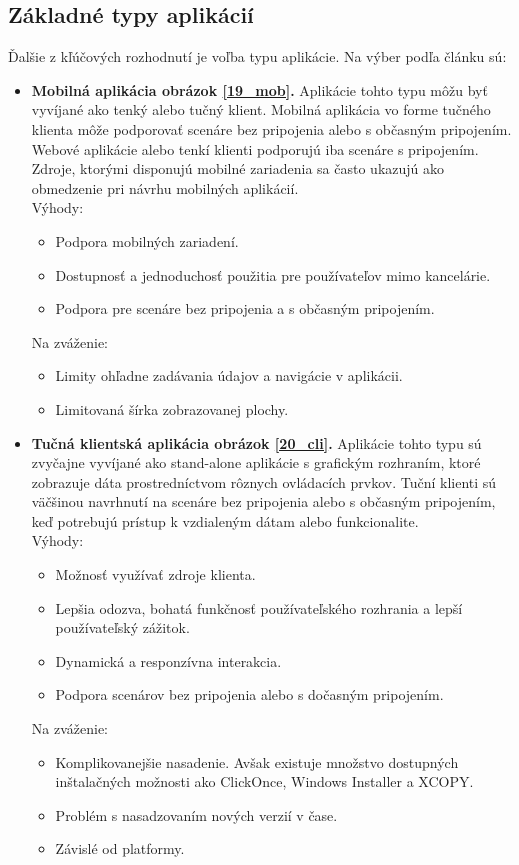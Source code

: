 \subsection{Základné typy aplikácií}
Ďalšie z kľúčových rozhodnutí je voľba typu aplikácie. Na výber podľa  článku \cite{IOT03} sú:
\begin{itemize}
\item
 \textbf{Mobilná aplikácia obrázok \ref{19_mob}.} Aplikácie tohto typu môžu byť vyvíjané ako tenký alebo tučný klient. Mobilná aplikácia vo forme tučného klienta môže podporovať scenáre bez pripojenia alebo s občasným pripojením. Webové aplikácie alebo tenkí klienti podporujú iba scenáre s pripojením. Zdroje, ktorými disponujú mobilné zariadenia sa často ukazujú ako obmedzenie pri návrhu mobilných aplikácií. \\
Výhody: 
 \begin{itemize}
   \item  Podpora mobilných zariadení.
   \item  Dostupnosť a jednoduchosť použitia pre používateľov mimo kancelárie.
   \item  Podpora pre scenáre bez pripojenia a s občasným pripojením.   
 \end{itemize}
Na zváženie: 
 \begin{itemize}
   \item Limity ohľadne zadávania údajov a navigácie v aplikácii.
   \item Limitovaná šírka zobrazovanej plochy.   
 \end{itemize}
 
\item
 \textbf{Tučná klientská aplikácia obrázok \ref{20_cli}.} Aplikácie tohto typu sú zvyčajne vyvíjané ako stand-alone aplikácie s grafickým rozhraním, ktoré zobrazuje dáta prostredníctvom rôznych ovládacích prvkov. Tuční klienti sú väčšinou navrhnutí na scenáre bez pripojenia alebo s občasným pripojením, keď potrebujú prístup k vzdialeným dátam alebo funkcionalite. \\
Výhody: 
 \begin{itemize}
   \item  Možnosť využívať zdroje klienta.
   \item  Lepšia odozva, bohatá funkčnosť používateľského rozhrania a lepší používateľský zážitok.
   \item  Dynamická a responzívna interakcia.
   \item Podpora scenárov bez pripojenia alebo s dočasným pripojením.   
 \end{itemize}
Na zváženie: 
 \begin{itemize}
   \item Komplikovanejšie nasadenie. Avšak existuje množstvo dostupných inštalačných možnosti ako ClickOnce, Windows Installer a XCOPY.
   \item Problém s nasadzovaním nových verzií v čase.   
   \item Závislé od platformy.
 \end{itemize}


\end{itemize}
